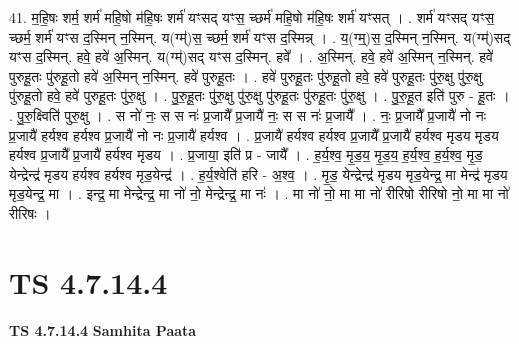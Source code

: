 \documentclass[17pt]{extarticle}
\begin{document}
41. म॒हि॒षः शर्म॒ शर्म॑ महि॒षो म॑हि॒षः शर्म॑ यꣳसद् यꣳस॒ च्छर्म॑ महि॒षो म॑हि॒षः शर्म॑ यꣳसत् । . शर्म॑ यꣳसद् यꣳस॒ च्छर्म॒ शर्म॑ यꣳस द॒स्मिन् न॒स्मिन्. य(ग्म्॑)स॒ च्छर्म॒ शर्म॑ यꣳस द॒स्मिन्न् । . य॒(ग्म्॒)स॒ द॒स्मिन् न॒स्मिन्. य(ग्म्॑)सद् यꣳस द॒स्मिन्. हवे॒ हवे॑ अ॒स्मिन्. य(ग्म्॑)सद् यꣳस द॒स्मिन्. हवे᳚ । . अ॒स्मिन्. हवे॒ हवे॑ अ॒स्मिन् न॒स्मिन्. हवे॑ पुरुहू॒तः पु॑रुहू॒तो हवे॑ अ॒स्मिन् न॒स्मिन्. हवे॑ पुरुहू॒तः । . हवे॑ पुरुहू॒तः पु॑रुहू॒तो हवे॒ हवे॑ पुरुहू॒तः पु॑रु॒क्षु पु॑रु॒क्षु पु॑रुहू॒तो हवे॒ हवे॑ पुरुहू॒तः पु॑रु॒क्षु । . पु॒रु॒हू॒तः पु॑रु॒क्षु पु॑रु॒क्षु पु॑रुहू॒तः पु॑रुहू॒तः पु॑रु॒क्षु । . पु॒रु॒हू॒त इति॑ पुरु - हू॒तः । . पु॒रु॒क्ष्विति॑ पुरु॒क्षु । . स नो॑ नः॒ स स नः॑ प्र॒जायै᳚ प्र॒जायै॑ नः॒ स स नः॑ प्र॒जायै᳚ । . नः॒ प्र॒जायै᳚ प्र॒जायै॑ नो नः प्र॒जायै॑ हर्यश्व हर्यश्व प्र॒जायै॑ नो नः प्र॒जायै॑ हर्यश्व । . प्र॒जायै॑ हर्यश्व हर्यश्व प्र॒जायै᳚ प्र॒जायै॑ हर्यश्व मृडय मृडय हर्यश्व प्र॒जायै᳚ प्र॒जायै॑ हर्यश्व मृडय । . प्र॒जाया॒ इति॑ प्र - जायै᳚ । . ह॒र्य॒श्व॒ मृ॒ड॒य॒ मृ॒ड॒य॒ ह॒र्य॒श्व॒ ह॒र्य॒श्व॒ मृ॒ड॒ येन्द्रेन्द्र॑ मृडय हर्यश्व हर्यश्व मृड॒येन्द्र॑ । . ह॒र्य॒श्वेति॑ हरि - अ॒श्व॒ । . मृ॒ड॒ येन्द्रेन्द्र॑ मृडय मृड॒येन्द्र॒ मा मेन्द्र॑ मृडय मृड॒येन्द्र॒ मा । . इन्द्र॒ मा मेन्द्रेन्द्र॒ मा नो॑ नो॒ मेन्द्रेन्द्र॒ मा नः॑ । . मा नो॑ नो॒ मा मा नो॑ रीरिषो रीरिषो नो॒ मा मा नो॑ रीरिषः । \newline
\pagebreak
{}

\section{ TS 4.7.14.4 }

\textbf{TS 4.7.14.4 } \newline
\textbf{Samhita Paata} \newline
\end{document}
